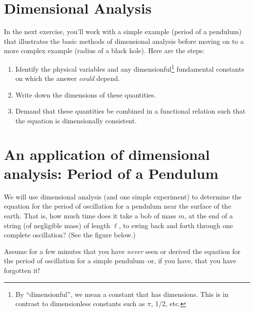 \documentclass[11pt, letterpaper, openany]{book}
\begin{document}
\section{Dimensional Analysis}

In the next exercise, you'll work with a simple example (period of a pendulum) that illustrates the basic methods of dimensional analysis before moving on to a more complex example (radius of a black hole). Here are the steps:
\begin{enumerate}[label=(\alph*)]
    \item Identify the physical variables and any dimensionful\footnote{By ``dimensionful'', we mean a constant that has dimensions. This is in contrast to dimensionless constants such as $\pi$, 1/2, etc.} fundamental constants on which the answer \textit{could} depend.
    \item Write down the dimensions of these quantities.
    \item Demand that these quantities be combined in a functional relation such that the equation is dimensionally consistent.
\end{enumerate}

\section{An application of dimensional analysis: Period of a Pendulum}

We will use dimensional analysis (and one simple experiment) to determine the equation for the period of oscillation for a pendulum near the surface of the earth. That is, how much time does it take a bob of mass $m$, at the end of a string (of negligible mass) of length $\ell$, to swing back and forth through one complete oscillation? (See the figure below.)

Assume for a few minutes that you have \textit{never} seen or derived the equation for the period of oscillation for a simple pendulum--or, if you have, that you have forgotten it!

\begin{center}
\end{center}
\end{document}
